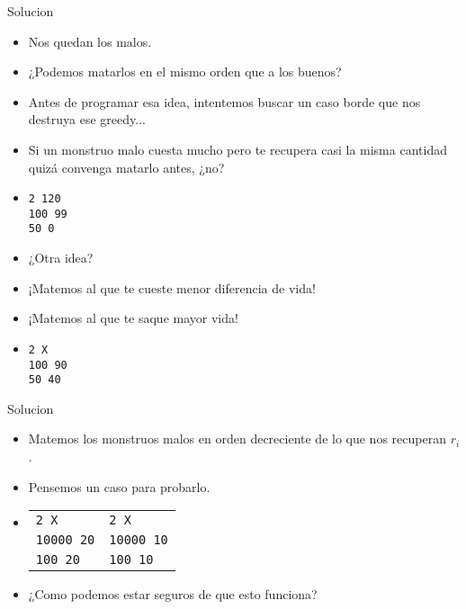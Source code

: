 \documentclass{beamer}
\begin{document}
\begin{frame}{Solucion}
  \begin{itemize}
    \item Nos quedan los malos.\pause
    \item ¿Podemos matarlos en el mismo orden que a los buenos?\pause
    \item Antes de programar esa idea, intentemos buscar un caso borde
      que nos destruya ese greedy...\pause
    \item Si un monstruo malo cuesta mucho pero te recupera casi la
      misma cantidad quizá convenga matarlo antes, ¿no?\pause
    \item \texttt{2 120}\\ \texttt{100 99}\\ \texttt{50 0}\pause
    \item ¿Otra idea?
    \item ¡Matemos al que te cueste menor diferencia de vida!
    \item ¡Matemos al que te saque mayor vida!\pause
    \item \texttt{2 X}\\ \texttt{100 90}\\ \texttt{50 40}
  \end{itemize}
\end{frame}

\begin{frame}{Solucion}
  \begin{itemize}
  \item Matemos los monstruos malos en orden decreciente de lo que
    nos recuperan $r_i$.\pause
  \item Pensemos un caso para probarlo.\pause
  \item \begin{tabular}[t]{ll}
          \texttt{2 X}      & \texttt{2 X}\\
          \texttt{10000 20} & \texttt{10000 10}\\
          \texttt{100 20}   & \texttt{100 10}
        \end{tabular}\pause
  \item ¿Como podemos estar seguros de que esto funciona?
  \end{itemize}
\end{frame}

\end{document}
